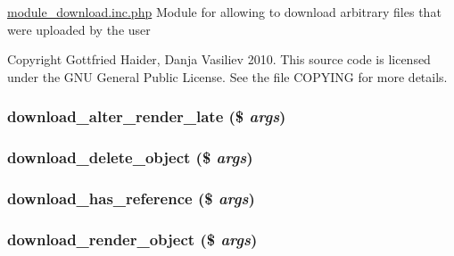 \hyperlink{module__download_8inc_8php}{module\_\-download.inc.php} Module for allowing to download arbitrary files that were uploaded by the user

Copyright Gottfried Haider, Danja Vasiliev 2010. This source code is licensed under the GNU General Public License. See the file COPYING for more details. \hypertarget{module__download_8inc_8php_61a6050abc43cf71d0ca422a9240ae7c}{
\subsubsection[{download\_\-alter\_\-render\_\-late}]{\setlength{\rightskip}{0pt plus 5cm}download\_\-alter\_\-render\_\-late (\$ {\em args})}}
\label{module__download_8inc_8php_61a6050abc43cf71d0ca422a9240ae7c}


\hypertarget{module__download_8inc_8php_5fd781bf1e0393667b227abec7169b28}{
\subsubsection[{download\_\-delete\_\-object}]{\setlength{\rightskip}{0pt plus 5cm}download\_\-delete\_\-object (\$ {\em args})}}
\label{module__download_8inc_8php_5fd781bf1e0393667b227abec7169b28}


\hypertarget{module__download_8inc_8php_a80da3f3fd41f7f00f97043f7a2431c8}{
\subsubsection[{download\_\-has\_\-reference}]{\setlength{\rightskip}{0pt plus 5cm}download\_\-has\_\-reference (\$ {\em args})}}
\label{module__download_8inc_8php_a80da3f3fd41f7f00f97043f7a2431c8}


\hypertarget{module__download_8inc_8php_57c588f1fd0663aa16fd707a522bcc79}{
\subsubsection[{download\_\-render\_\-object}]{\setlength{\rightskip}{0pt plus 5cm}download\_\-render\_\-object (\$ {\em args})}}
\label{module__download_8inc_8php_57c588f1fd0663aa16fd707a522bcc79}


